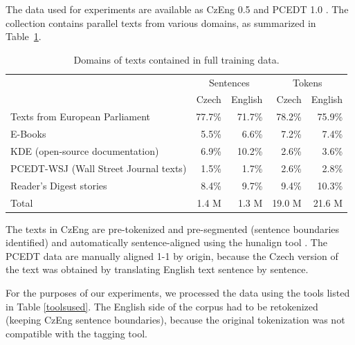 \documentclass[11pt]{book}
\theoremstyle{plain}
\begin{document}
The data used for \bidir{} experiments are available as CzEng 0.5
 and PCEDT 1.0 . The collection contains parallel texts from various domains, as
summarized in Table~\ref{czengratios}.


\begin{table}[ht]
\begin{tabular}{lrr|rr}
  &  \multicolumn{2}{c}{Sentences}  &  \multicolumn{2}{c}{Tokens}\\
  &  Czech                             &  English                          &  Czech  &  English\\
\hline
Texts from European Parliament         &  77.7\%  &  71.7\%  &  78.2\%  &  75.9\%\\
E-Books                                &  5.5\%   &  6.6\%   &  7.2\%   &  7.4\%\\
KDE (open-source documentation)        &  6.9\%   &  10.2\%  &  2.6\%   &  3.6\%\\
PCEDT-WSJ (Wall Street Journal texts)  &  1.5\%   &  1.7\%   &  2.6\%   &  2.8\%\\
Reader's Digest stories                &  8.4\%   &  9.7\%   &  9.4\%   &  10.3\%\\
\hline
Total                                  &  1.4 M   &  1.3 M   &  19.0 M  &  21.6 M\\
\end{tabular}
\caption{Domains of texts contained in full training data.}
\label{czengratios}
\end{table}

The texts in CzEng are pre-tokenized and pre-segmented (sentence boundaries identified) and
automatically sentence-aligned using the hunalign tool
. The
PCEDT data are manually aligned 1-1 by origin, because the Czech
version of the text was obtained by translating English text sentence by
sentence.

For the purposes of our experiments, we processed the data using the tools
listed in Table \ref{toolsused}.
The English side of the corpus had to be retokenized (keeping CzEng sentence
boundaries), because the original tokenization was not compatible with the tagging tool.
\end{document}
